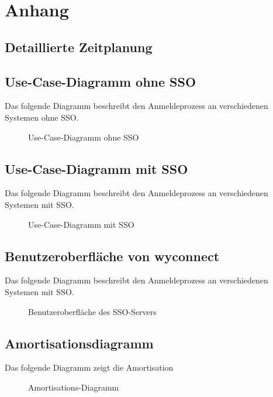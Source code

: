 \section{Anhang}
\subsection{Detaillierte Zeitplanung}
\label{app:Zeitplanung}





\clearpage

\subsection{Use-Case-Diagramm ohne SSO}
\label{app:Use-Case-Diagramm}
Das folgende Diagramm beschreibt den Anmeldeprozess an verschiedenen Systemen ohne \acs{SSO}.
\begin{figure}[htb]
\centering
{}
\caption{Use-Case-Diagramm ohne SSO}
\end{figure}
\clearpage

\subsection{Use-Case-Diagramm mit SSO}
\label{app:Use-Case-Diagramm2}
Das folgende Diagramm beschreibt den Anmeldeprozess an verschiedenen Systemen mit \acs{SSO}.
\begin{figure}[htb]
\centering
{}
\caption{Use-Case-Diagramm mit SSO}
\end{figure}
\clearpage

\subsection{Benutzeroberfläche von wyconnect}
\label{app:wyconnect-mockup}
Das folgende Diagramm beschreibt den Anmeldeprozess an verschiedenen Systemen mit \acs{SSO}.
\begin{figure}[htb]
\centering
{}
\caption{Benutzeroberfläche des SSO-Servers}
\end{figure}
\clearpage

\subsection{Amortisationsdiagramm}
\label{app:Amortisationsdiagramm}
Das folgende Diagramm zeigt die Amortisation
\begin{figure}[htb]
\centering
{}
\caption{Amortisations-Diagramm}
\end{figure}
\clearpage

